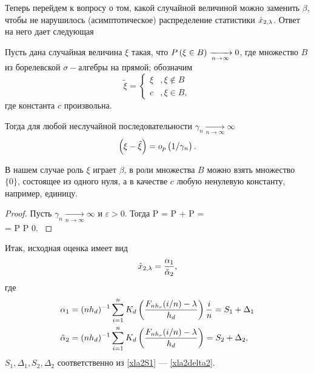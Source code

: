 \documentclass[a4paper,14pt,russian]{article}
\begin{document}
Теперь перейдем к вопросу о том, какой случайной величиной можно заменить $\beta$, чтобы не нарушилось (асимптотическое) распределение статистики $\hat{x}_{2,\lambda}$. Ответ на него дает следующая
\begin{lemma}
  Пусть дана случайная величина $\xi$ такая, что $P\left(\xi \in B\right) \xrightarrow[n \to \infty]{} 0$, где множество $B$ из борелевской $\sigma-$алгебры на прямой; обозначим
  $$
  \tilde{\xi} = \begin{cases}
    \xi &,  \xi \notin B \\
    c &, \xi \in B ,
  \end{cases}
  $$
  где константа $c$ произвольна.

  Тогда для любой неслучайной последовательности $\gamma_n \xrightarrow[n \to \infty]{} \infty$
  $$
  \left(\xi - \tilde{\xi}\right) = o_p\left(1/\gamma_n\right).
  $$
\label{xla2tilde}
\end{lemma}
  \begin{remark}
    В нашем случае роль $\xi$ играет $\beta$, в роли множества $B$ можно взять  множество $\{0\}$, состоящее из одного нуля, а в качестве $c$ любую ненулевую константу, например, единицу.
  \end{remark}

  \begin{proof}
    Пусть $\gamma_n \xrightarrow[n \to \infty]{} \infty$  и $\varepsilon > 0$. Тогда
    \ml
    {
    P = P\br{0 \geq \varepsilon} + P =\\=  P \leq P \xrightarrow[n \to \infty]{} 0.
    }
  \end{proof}
Итак, исходная оценка имеет вид
  \begin{equation}
    \hat{x}_{2,\lambda} = \frac{\alpha_1}{\tilde{\alpha}_2},
  \end{equation}
  где
  \begin{align}
    \alpha_1 &= (n h_d)^{-1} \sum_{i=1}^{n} K_d\left(\frac{F_{n h_r}(i/n)-\lambda}{h_d}\right)\frac{i}{n} \label{xla2alpha1} = S_1 + \Delta_1\\
    \tilde{\alpha}_2 &= (n h_d)^{-1} \sum_{i=1}^{n} K_d\left(\frac{F_{n h_r}(i/n)-\lambda}{h_d}\right)= S_2 + \Delta_2,
    \label{xla2tildealpha2}
  \end{align}
  $S_1,\Delta_1,S_2,\Delta_2$ соответственно из \eqref{xla2S1} --- \eqref{xla2delta2}.
\end{document}
